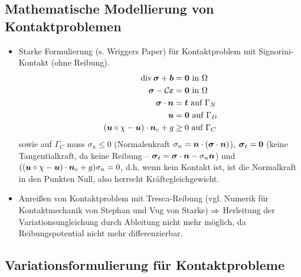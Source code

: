 \subsection{Mathematische Modellierung von Kontaktproblemen}

\begin{itemize}
\item Starke Formulierung (s. Wriggers Paper) für Kontaktproblem mit Signorini-Kontakt (ohne Reibung).
\begin{align}
\operatorname{div} \boldsymbol \sigma + \boldsymbol b &= \boldsymbol 0 \text{ in } \Omega\\
\boldsymbol \sigma  - \mathcal C \boldsymbol {\varepsilon} & = \boldsymbol 0 \text{ in } \Omega\\
\boldsymbol \sigma \cdot \boldsymbol n &= \boldsymbol t  \text{ auf } \Gamma_N \\
\boldsymbol u &= \boldsymbol 0 \text{ auf } \Gamma_D \\
(\boldsymbol u \circ \chi - \boldsymbol u) \cdot \boldsymbol n_c + g& \ge 0 \text{ auf } \Gamma_C
\end{align}
sowie auf $\Gamma_C$ muss $\sigma_n \le 0$ (Normalenkraft $\sigma_n = \boldsymbol n\cdot ( \boldsymbol \sigma \cdot \boldsymbol n)$), $\boldsymbol \sigma_t = \boldsymbol 0$ (keine Tangentialkraft, da keine Reibung – $\boldsymbol \sigma_t = \boldsymbol \sigma \cdot \boldsymbol n - \sigma_n \boldsymbol n$) und $((\boldsymbol u \circ \chi - \boldsymbol u) \cdot \boldsymbol n_c + g)\sigma_n = 0$, d.h. wenn kein Kontakt ist, ist die Normalkraft in den Punkten Null, also herrscht Kräftegleichgewicht.
\item Anreißen von Kontaktproblem mit Tresca-Reibung (vgl. Numerik für Kontaktmechanik von Stephan und Vug von Starke) $\Rightarrow$ Herleitung der Variationsungleichung durch Ableitung nicht mehr möglich, da Reibungspotential nicht mehr differenzierbar.
\end{itemize}

\subsection{Variationsformulierung für Kontaktprobleme}

